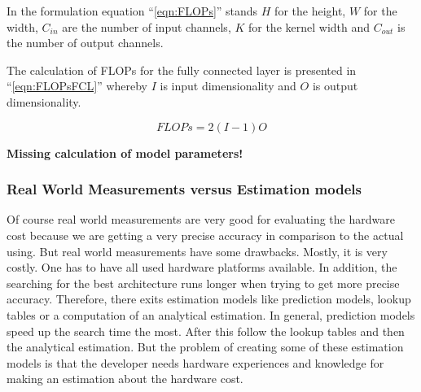 \documentclass[conference]{IEEEtran}
\begin{document}
In the formulation equation ``\eqref{eqn:FLOPs}'' stands $H$ for the height, $W$ for the width, $C_{in}$ are the number of input channels, $K$ for the kernel width and $C_{out}$ is the number of output channels.

The calculation of FLOPs for the fully connected layer is presented in ``\eqref{eqn:FLOPsFCL}'' whereby $I$ is input dimensionality and $O$ is output dimensionality. 

\begin{equation}
\label{eqn:FLOPsFCL}
FLOPs = 2(I-1)O
\end{equation} 

\textbf{Missing calculation of model parameters!}

\subsubsection{Real World Measurements versus Estimation models}

Of course real world measurements are very good for evaluating the hardware cost because we are getting a very precise accuracy in comparison to the actual using. But real world measurements have some drawbacks. Mostly, it is very costly. One has to have all used hardware platforms available. In addition, the searching for the best architecture runs longer when trying to get more precise accuracy. Therefore, there exits estimation models like prediction models, lookup tables or a computation of an analytical estimation. In general, prediction models speed up the search time the most. After this follow the lookup tables and then the analytical estimation. But the problem of creating some of these estimation models is that the developer needs hardware experiences and knowledge for making an estimation about the hardware cost.
\end{document}
